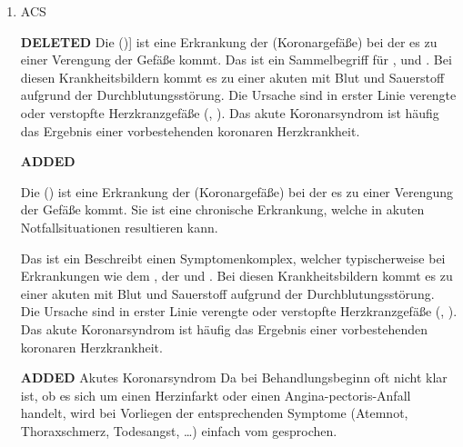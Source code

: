 \documentclass[
ngerman,
paper=a4,
asymmetric,
fontsize=10pt,
headings=small,
draft=false,
numbers=noenddot,
bibtotocnumbered,
footnotes=multiple,
]{scrreprt}
\newcommand{\jALT}{{\color{red}\sffamily\textbf{DELETED}\hrulefill\newline\newline}}
\newcommand{\jALTende}{\newline{\color{red}\rule{\linewidth}{2pt}\newline}}
\newcommand{\jNEU}{{\color{green}\sffamily\textbf{ADDED}\hrulefill\newline\newline}}
\newcommand{\jNEUende}{\newline{\color{green}\rule{\linewidth}{3pt}\newline}}
\begin{document}
\begin{enumerate}
{}
{}
{}
{} 
\jNEUende




\item ACS

\jALT
{}
{Die  ()] ist eine
 Erkrankung der  (Koronargefäße) bei der
es zu einer Verengung der Gefäße kommt. Das 
ist ein
Sammelbegriff für ,  und
. Bei diesen Krankheitsbildern
kommt es zu einer akuten  mit Blut und Sauerstoff aufgrund der
 Durchblutungsstörung. Die Ursache sind in erster Linie
 verengte oder verstopfte Herzkranzgefäße
 (,
 ). Das akute Koronarsyndrom
 ist häufig das Ergebnis einer vorbestehenden koronaren Herzkrankheit.}
 {}
 {}
 {}
 {}
\jALTende

\jNEU
\Text{\TxBeschreibung}
{Die  () ist eine
Erkrankung der  (Koronargefäße) bei der
es zu einer Verengung der Gefäße kommt. Sie ist eine
chronische Erkrankung, welche in akuten Notfallsituationen
resultieren kann. 

Das 
ist ein Beschreibt einen Symptomenkomplex, welcher
typischerweise bei Erkrankungen wie dem 
, der  und . Bei diesen Krankheitsbildern kommt es zu einer akuten  mit Blut und Sauerstoff aufgrund der
 Durchblutungsstörung. Die Ursache sind in erster Linie
 verengte oder verstopfte Herzkranzgefäße
 (,
 ). Das akute Koronarsyndrom
 ist häufig das Ergebnis einer vorbestehenden koronaren Herzkrankheit.}
 {}
 {}
 {}
 {}
\jNEUende

\jNEU
\TextSlide
{Akutes Koronarsyndrom}
{Da bei Behandlungsbeginn oft nicht klar ist, ob es sich um
einen Herzinfarkt oder einen Angina-pectoris-Anfall handelt,
wird bei Vorliegen der entsprechenden Symptome (Atemnot,
Thoraxschmerz, Todesangst, \ldots) einfach vom  gesprochen. 
}{}{}{}{}{}

\jNEUende


\end{enumerate}
\end{document}
